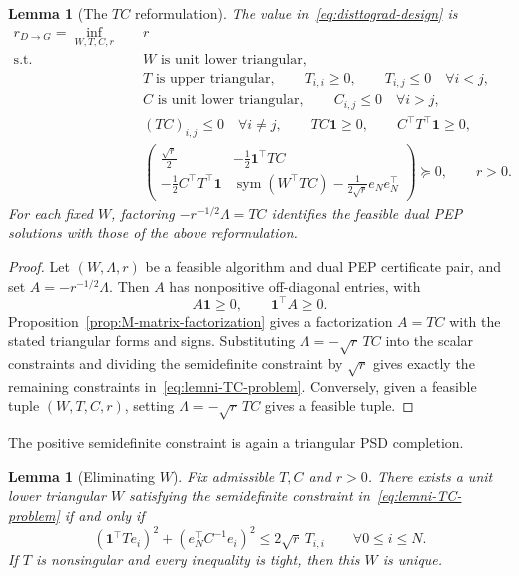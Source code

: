 \documentclass[11pt]{article}
\newtheorem{lemma}[thm]{Lemma}
\begin{document}
\begin{lemma}[The $TC$ reformulation]\label{lem:lemni-TC}
The value in~\eqref{eq:disttograd-design} is
\begin{equation}\label{eq:lemni-TC-problem}
\begin{aligned}
 r_{D\rightarrow G}
 =\inf_{W,T,C,r}\quad &r\\
 \mathrm{s.t.}\quad
 &W\text{ is unit lower triangular},\\
 &T\text{ is upper triangular},\qquad T_{i,i}\geq0,\qquad T_{i,j}\leq0 \quad\forall i<j,\\
 &C\text{ is unit lower triangular},\qquad C_{i,j}\leq0\quad \forall i>j,\\
 &(TC)_{i,j}\leq0\quad \forall i\neq j,\qquad TC\mathbf1\geq0,
 \qquad C^\top T^\top\mathbf1\geq0,\\
 &\begin{pmatrix}
       \frac{\sqrt r}{2} &-\frac12\mathbf1^\top TC\\[1mm]
       -\frac12C^\top T^\top\mathbf1
       &\operatorname{sym}(W^\top TC)-\frac1{2\sqrt r}e_Ne_N^\top
   \end{pmatrix}\succeq0,\qquad r>0.
\end{aligned}
\end{equation}
For each fixed $W$, factoring $-r^{-1/2}\Lambda=TC$ identifies the feasible dual PEP solutions with those of the above reformulation.
\end{lemma}

\begin{proof}
Let $(W,\Lambda,r)$ be a feasible algorithm and dual PEP certificate pair, and
set $A=-r^{-1/2}\Lambda$. Then $A$ has nonpositive off-diagonal entries, with
\[
    A\mathbf1\geq0,
    \qquad
    \mathbf1^\top A\geq0.
\]
Proposition~\ref{prop:M-matrix-factorization} gives a factorization $A=TC$
with the stated triangular forms and signs. Substituting
$\Lambda=-\sqrt r\,TC$ into the scalar constraints and dividing the
semidefinite constraint by $\sqrt r$ gives exactly the remaining constraints
in~\eqref{eq:lemni-TC-problem}. Conversely, given a feasible tuple
$(W,T,C,r)$, setting $\Lambda=-\sqrt r\,TC$ gives a feasible tuple.
\end{proof}

The positive semidefinite constraint is again a triangular PSD completion.

\begin{lemma}[Eliminating $W$]\label{lem:lemni-eliminate-W}
Fix admissible $T,C$ and $r>0$. There exists a unit lower triangular $W$
satisfying the semidefinite constraint in~\eqref{eq:lemni-TC-problem} if and
only if
\begin{equation}\label{eq:lemni-diagonal-conditions}
    (\mathbf1^\top Te_i)^2+(e_N^\top C^{-1}e_i)^2
    \leq 2\sqrt r\,T_{i,i}
    \qquad \forall 0\leq i\leq N.
\end{equation}
If $T$ is nonsingular and every inequality is tight, then this $W$ is unique.
\end{lemma}
\end{document}

